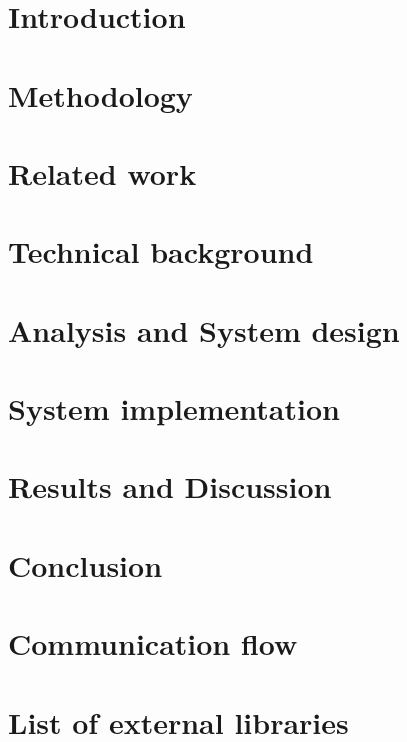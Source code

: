 \documentclass[Report.tex]{subfiles}
\begin{document}
\chapter{Introduction}\label{sec:intro}
  
\clearpage

\chapter{Methodology}\label{sec:methodology}
  
\clearpage

\chapter{Related work}\label{sec:similar}
  
\clearpage

\chapter{Technical background}\label{sec:tech_background}
  
\clearpage

\chapter{Analysis and System design}\label{sec:system}
  
\clearpage

\chapter{System implementation}\label{sec:system}
  
\clearpage

\chapter{Results and Discussion}\label{sec:discussion}
  
\clearpage

\chapter{Conclusion}\label{sec:conclusion}
  
\clearpage

\nocite{*} %
\printbibliography%
\clearpage

\begin{appendices}
\chapter{Communication flow}
  
\clearpage
\chapter{List of external libraries}
  
\end{appendices}
\end{document}
